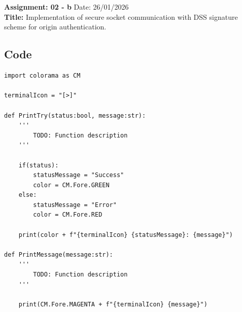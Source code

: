 \section{}
\noindent \textbf{Assignment: 02 - b}
\hfill Date: 26/01/2026 \\
\noindent
\textbf{Title:} Implementation of secure socket communication with DSS signature
scheme for origin authentication.

\subsection*{Code}
\begin{lstlisting}[style=mypython, caption={TerminalMessage.py}, label={code:A-2-b-TerminalMessage}]
import colorama as CM

terminalIcon = "[>]"

def PrintTry(status:bool, message:str):
    '''
        TODO: Function description
    '''

    if(status):
        statusMessage = "Success"
        color = CM.Fore.GREEN
    else:
        statusMessage = "Error"
        color = CM.Fore.RED

    print(color + f"{terminalIcon} {statusMessage}: {message}")

def PrintMessage(message:str):
    '''
        TODO: Function description
    '''

    print(CM.Fore.MAGENTA + f"{terminalIcon} {message}")
\end{lstlisting}

